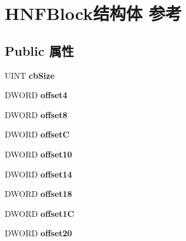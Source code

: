\hypertarget{struct_h_n_f_block}{}\section{H\+N\+F\+Block结构体 参考}
\label{struct_h_n_f_block}
\subsection*{Public 属性}
\begin{DoxyCompactItemize}
\item 
\mbox{\label{struct_h_n_f_block_a63ce89b373b091b267ab3259e9fc6ff6}} 
U\+I\+NT {\bfseries cb\+Size}
\item 
\mbox{\label{struct_h_n_f_block_aeab2b4ae0d7c7801a82a359d7ca68b89}} 
D\+W\+O\+RD {\bfseries offset4}
\item 
\mbox{\label{struct_h_n_f_block_a58551061d5a5c61164b05091ed185b00}} 
D\+W\+O\+RD {\bfseries offset8}
\item 
\mbox{\label{struct_h_n_f_block_a44c851e1bb3cbf310a8c2cb8dd125f6d}} 
D\+W\+O\+RD {\bfseries offsetC}
\item 
\mbox{\label{struct_h_n_f_block_a01bedaeb370f2749f69702c412b09252}} 
D\+W\+O\+RD {\bfseries offset10}
\item 
\mbox{\label{struct_h_n_f_block_ae6f0200166049b9419d1a5ad74809cc1}} 
D\+W\+O\+RD {\bfseries offset14}
\item 
\mbox{\label{struct_h_n_f_block_a456713010baa5a626ca2dae6a87ef5a9}} 
D\+W\+O\+RD {\bfseries offset18}
\item 
\mbox{\label{struct_h_n_f_block_a9511a5aa018e8350c742a56acabe1c58}} 
D\+W\+O\+RD {\bfseries offset1C}
\item 
\mbox{\label{struct_h_n_f_block_a18dbd37498d721bf2ece135e20dba22a}} 
D\+W\+O\+RD {\bfseries offset20}
\item 
\mbox{\label{struct_h_n_f_block_ac943acfb53bb4e63b41833f56edfcf1f}} 

\end{DoxyCompactItemize}
